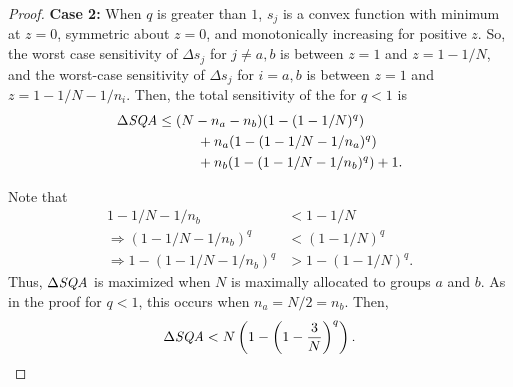 \begin{proof}
\noindent\textbf{Case 2:} When $q$ is greater than $1$, $s_j$ is a convex function with minimum at $z=0$, symmetric about $z=0$, and monotonically increasing for positive $z$. So, the worst case sensitivity of $\Delta s_j$ for $j \ne a,b$ is between $z= 1$ and $z=1-1/N$, and the worst-case sensitivity of $\Delta s_j$ for $i=a,b$ is between $z=1$ and $z = 1 - 1/N - 1/n_i$. Then, the total sensitivity of the \spa for $q<1$ is
%
\begin{align*}
\Delta\textit{SQA} &\le  (N-n_a-n_b)(1-(1-1/N)^q) \\
    & \hspace{1cm} + n_a(1-(1-1/N-1/n_a)^q) \\
	& \hspace{1cm} + n_b(1-(1-1/N-1/n_b)^q) + 1.
\end{align*}

Note that 
\begin{align*}
1-1/N-1/n_b &< 1-1/N \\
\Rightarrow (1-1/N-1/n_b)^q &< (1-1/N)^q \\
\Rightarrow 1 - (1-1/N-1/n_b)^q &> 1- (1-1/N)^q.
\end{align*}
Thus, $\Delta\textit{SQA}$ is maximized when $N$ is maximally allocated to groups $a$ and $b$. As in the proof for $q<1$, this occurs when $n_a = N/2 = n_b$. Then, 
$$\Delta\textit{SQA} < N \left( 1 - \left( 1 - \frac{3}{N}\right)^q \right).$$
\end{proof}